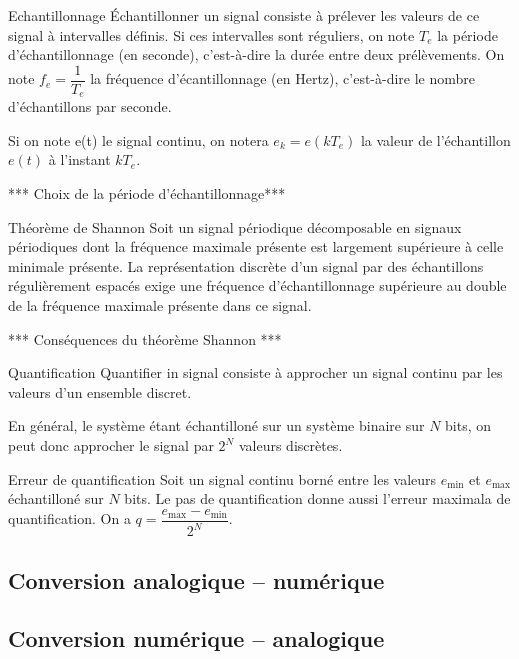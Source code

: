 \begin{defi}{Echantillonnage}
Échantillonner un signal consiste à prélever les valeurs de ce signal à intervalles définis. Si ces intervalles sont réguliers, on note $T_e$ la période d'échantillonnage (en seconde), c'est-à-dire la durée entre deux prélèvements. On note $f_e = \dfrac{1}{T_e}$ la fréquence d'écantillonnage (en Hertz), c'est-à-dire le nombre d'échantillons par seconde.

Si on note e(t) le signal continu, on notera $e_k = e(kT_e)$ la valeur de l'échantillon $e(t)$ à l'instant $kT_e$. 

\end{defi}

*** Choix de la période d'échantillonnage***



\begin{theorem}{Théorème de Shannon}
Soit un signal périodique décomposable en signaux périodiques dont la fréquence maximale présente est largement supérieure à celle minimale présente.
La représentation discrète d’un signal par des échantillons régulièrement espacés exige une fréquence d’échantillonnage supérieure au double de la fréquence maximale présente dans ce signal.
\end{theorem}
*** Conséquences du théorème Shannon *** 



\begin{defi}{Quantification}
Quantifier in signal consiste à approcher un signal continu par les valeurs d'un ensemble discret. 

En général, le système étant échantilloné sur un système binaire sur $N$ bits, on peut donc approcher le signal par $2^N$ valeurs discrètes.
\end{defi}

\begin{defi}{Erreur de quantification}
Soit un signal continu borné entre les valeurs $e_{\text{min}}$ et $e_{\text{max}}$ échantilloné sur $N$ bits. Le pas de quantification donne aussi l'erreur maximala de quantification. On a $q = \dfrac{e_{\text{max}}-e_{\text{min}}}{2^N}$.

\end{defi}


\subsection{Conversion analogique -- numérique}

\subsection{Conversion numérique -- analogique}

